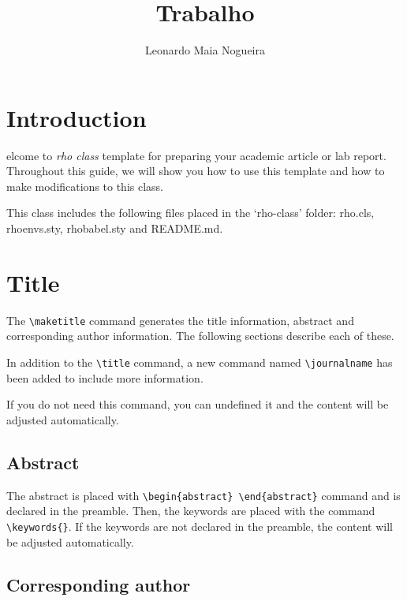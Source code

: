 \documentclass[9pt,a4paper,twoside]{rho-class/rho}
\title{Trabalho}
\author[1]{Leonardo Maia Nogueira}
\begin{document}
	
    \maketitle
    \thispagestyle{firststyle}


\section{Introduction}

    elcome to \textit{rho class} template for preparing your academic article or lab report. Throughout this guide, we will show you how to use this template and how to make modifications to this class. 
    
    This class includes the following files placed in the ‘rho-class’ folder: rho.cls, rhoenvs.sty, rhobabel.sty and README.md.

\section{Title}

    The \verb|\maketitle| command generates the title information, abstract and corresponding author information. The following sections describe each of these.

    In addition to the \verb|\title| command, a new command named \verb|\journalname| has been added to include more information. 

    If you do not need this command, you can undefined it and the content will be adjusted automatically.

    \subsection{Abstract}

        The abstract is placed with \verb|\begin{abstract} \end{abstract}| command and is declared in the preamble. Then, the keywords are placed with the command \verb|\keywords{}|. If the keywords are not declared in the preamble, the content will be adjusted automatically.

    \subsection{Corresponding author}
\end{document}
